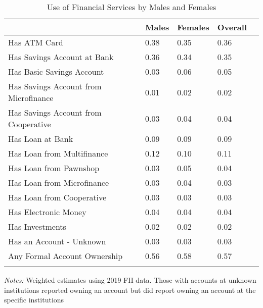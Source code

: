 \begin{table}[H] \begin{adjustbox}{max width=\textwidth} \begin{threeparttable} \caption{Use of Financial Services by Males and Females} \label{servgender} {\begin{tabular}{l*{1}{llll}} \toprule  & Males & Females & Overall \\
\hline
Has ATM Card                                                                    &     0.38&     0.35&     0.36\\
Has Savings Account at Bank                                                     &     0.36&     0.34&     0.35\\
Has Basic Savings Account                                                       &     0.03&     0.06&     0.05\\
Has Savings Account from Microfinance                                           &     0.01&     0.02&     0.02\\
Has Savings Account from Cooperative                                            &     0.03&     0.04&     0.04\\
Has Loan at Bank                                                                &     0.09&     0.09&     0.09\\
Has Loan from Multifinance                                                      &     0.12&     0.10&     0.11\\
Has Loan from Pawnshop                                                          &     0.03&     0.05&     0.04\\
Has Loan from Microfinance                                                      &     0.03&     0.04&     0.03\\
Has Loan from Cooperative                                                       &     0.03&     0.03&     0.03\\
Has Electronic Money                                                            &     0.04&     0.04&     0.04\\
Has Investments                                                                 &     0.02&     0.02&     0.02\\
Has an Account - Unknown                                                        &     0.03&     0.03&     0.03\\
Any Formal Account Ownership                                                    &     0.56&     0.58&     0.57\\
\bottomrule
\addlinespace[1.5ex] \end{tabular}} \begin{tablenotes}[flushleft]  \small \item \emph{Notes:} Weighted estimates using 2019 FII data. Those with accounts at unknown institutions reported owning an account but did report owning an account at the specific institutions \end{tablenotes} \end{threeparttable} \end{adjustbox} \end{table} \vspace*{-5mm}
